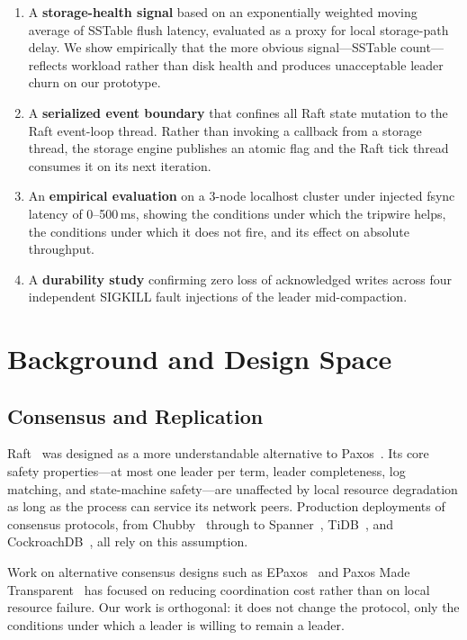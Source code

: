 \documentclass[conference, a4paper]{IEEEtran}
\begin{document}
\begin{enumerate}
    \item A \textbf{storage-health signal} based on an exponentially
    weighted moving average of SSTable flush latency, evaluated as a
    proxy for local storage-path delay. We show empirically that the
    more obvious signal---SSTable count---reflects workload rather than
    disk health and produces unacceptable leader churn on our prototype.
    \item A \textbf{serialized event boundary} that confines all Raft
    state mutation to the Raft event-loop thread. Rather than invoking
    a callback from a storage thread, the storage engine publishes an
    atomic flag and the Raft tick thread consumes it on its next
    iteration.
    \item An \textbf{empirical evaluation} on a 3-node localhost cluster
    under injected fsync latency of 0--500\,ms, showing the conditions
    under which the tripwire helps, the conditions under which it does
    not fire, and its effect on absolute throughput.
    \item A \textbf{durability study} confirming zero loss of
    acknowledged writes across four independent SIGKILL fault injections
    of the leader mid-compaction.
\end{enumerate}

\section{Background and Design Space}

\subsection{Consensus and Replication}

Raft~\cite{raft} was designed as a more understandable alternative to
Paxos~\cite{lamport_paxos,lamport_part_time}. Its core safety
properties---at most one leader per term, leader completeness, log
matching, and state-machine safety---are unaffected by local resource
degradation as long as the process can service its network peers.
Production deployments of consensus protocols, from
Chubby~\cite{chandra_paxos_live} through to Spanner~\cite{corbett_spanner},
TiDB~\cite{huang_tidb}, and CockroachDB~\cite{cockroachdb_taft}, all rely
on this assumption.

Work on alternative consensus designs such as EPaxos~\cite{moraru_epaxos}
and Paxos Made Transparent~\cite{mao_paxos_transparent} has focused on
reducing coordination cost rather than on local resource failure. Our
work is orthogonal: it does not change the protocol, only the conditions
under which a leader is willing to remain a leader.
\end{document}
